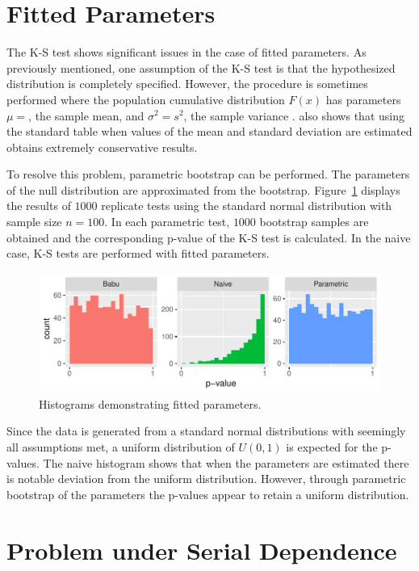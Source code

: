 \documentclass[12pt, letterpaper, titlepage]{article}
\makeatletter
\newcommand*{\Xbar}{}%
\DeclareRobustCommand*{\Xbar}{%
  \mathpalette\@Xbar{}%
}
\newcommand*{\@Xbar}[2]{%
  \sbox0{$#1\mathrm{X}\m@th$}%
  \sbox2{$#1X\m@th$}%
  \rlap{%
    \hbox to\wd2{%
      \hfill
      $\overline{%
        \vrule width 0pt height\ht0 %
        \kern\wd0 %
      }$%
    }%
  }%
  \copy2 %
}
\makeatother
\begin{document}
\hypertarget{sec:fitted}{%
\section{Fitted Parameters}\label{sec:fitted}}

The K-S test shows significant issues in the case of fitted parameters. As previously mentioned, one assumption of the K-S test is that the hypothesized distribution is completely specified. However, the procedure is sometimes performed where the population cumulative distribution $F(x)$ has parameters $\mu=\Xbar$, the sample mean, and $\sigma^2=s^2$, the sample variance \citep{Lilliefors}. \citet{Lilliefors} also shows that using the standard table when values of the mean and standard deviation are estimated obtains extremely conservative results. 

To resolve this problem, parametric bootstrap can be performed. The parameters of the null distribution are approximated from the bootstrap. Figure~\ref{fig:hist_fitted} displays the results of $1000$ replicate tests using the standard normal distribution with sample size $n=100$. In each parametric test, $1000$ bootstrap samples are obtained and the corresponding p-value of the K-S test is calculated. In the naive case, K-S tests are performed with fitted parameters.

\begin{figure}[tbp]
  \centering
  \includegraphics{hist_fitted}
  \caption{Histograms demonstrating fitted parameters.}
  \label{fig:hist_fitted}
\end{figure}

Since the data is generated from a standard normal distributions with seemingly all assumptions met, a uniform distribution of $U(0,1)$ is expected for the p-values. The naive histogram shows that when the parameters are estimated there is notable deviation from the uniform distribution. However, through parametric bootstrap of the parameters the p-values appear to retain a uniform distribution.

\hypertarget{sec:correlation}{%
\section{Problem under Serial Dependence}\label{sec:correlation}}
\end{document}
